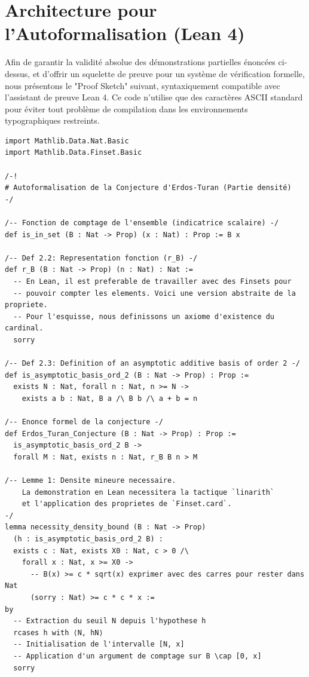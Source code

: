 
\section{Architecture pour l'Autoformalisation (Lean 4)}

Afin de garantir la validité absolue des démonstrations partielles énoncées ci-dessus, et d'offrir un squelette de preuve pour un système de vérification formelle, nous présentons le "Proof Sketch" suivant, syntaxiquement compatible avec l'assistant de preuve Lean 4. Ce code n'utilise que des caractères ASCII standard pour éviter tout problème de compilation dans les environnements typographiques restreints.

\begin{verbatim}
import Mathlib.Data.Nat.Basic
import Mathlib.Data.Finset.Basic

/-!
# Autoformalisation de la Conjecture d'Erdos-Turan (Partie densité)
-/

/-- Fonction de comptage de l'ensemble (indicatrice scalaire) -/
def is_in_set (B : Nat -> Prop) (x : Nat) : Prop := B x

/-- Def 2.2: Representation fonction (r_B) -/
def r_B (B : Nat -> Prop) (n : Nat) : Nat :=
  -- En Lean, il est preferable de travailler avec des Finsets pour
  -- pouvoir compter les elements. Voici une version abstraite de la propriete.
  -- Pour l'esquisse, nous definissons un axiome d'existence du cardinal.
  sorry

/-- Def 2.3: Definition of an asymptotic additive basis of order 2 -/
def is_asymptotic_basis_ord_2 (B : Nat -> Prop) : Prop :=
  exists N : Nat, forall n : Nat, n >= N ->
    exists a b : Nat, B a /\ B b /\ a + b = n

/-- Enonce formel de la conjecture -/
def Erdos_Turan_Conjecture (B : Nat -> Prop) : Prop :=
  is_asymptotic_basis_ord_2 B ->
  forall M : Nat, exists n : Nat, r_B B n > M

/-- Lemme 1: Densite mineure necessaire.
    La demonstration en Lean necessitera la tactique `linarith`
    et l'application des proprietes de `Finset.card`.
-/
lemma necessity_density_bound (B : Nat -> Prop)
  (h : is_asymptotic_basis_ord_2 B) :
  exists c : Nat, exists X0 : Nat, c > 0 /\
    forall x : Nat, x >= X0 ->
      -- B(x) >= c * sqrt(x) exprimer avec des carres pour rester dans Nat
      (sorry : Nat) >= c * c * x :=
by
  -- Extraction du seuil N depuis l'hypothese h
  rcases h with ⟨N, hN⟩
  -- Initialisation de l'intervalle [N, x]
  -- Application d'un argument de comptage sur B \cap [0, x]
  sorry
\end{verbatim}

